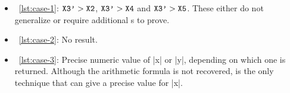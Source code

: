 \begin{itemize}

\item~\autoref{lst:case-1}: \(\prm{X3'} > \prm{X2}\), \(\prm{X3'} > \prm{X4}\)
and \(\prm{X3'} > \prm{X5}\). These either do not generalize or
require additional s to prove.

\item~\autoref{lst:case-2}: No result.

\item~\autoref{lst:case-3}: Precise numeric value of \pr|x| or \pr|y|, depending
on which one is returned. Although the arithmetic formula is not recovered,
 is the only technique that can give a precise value for \pr|x|.

\end{itemize}

